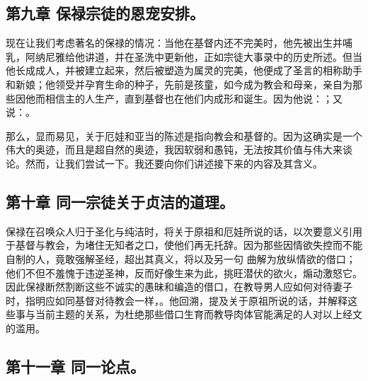 
\subsection{第九章 保禄宗徒的恩宠安排。}

现在让我们考虑著名的保禄的情况：当他在基督内还不完美时，他先被出生并哺乳，阿纳尼雅给他讲道，并在圣洗中更新他，正如宗徒大事录中的历史所述。但当他长成成人，并被建立起来，然后被塑造为属灵的完美，他便成了圣言的相称助手和新娘；他领受并孕育生命的种子，先前是孩童，如今成为教会和母亲，亲自为那些因他而相信主的人生产，直到基督也在他们内成形和诞生。因为他说：；又说：。\par

那么，显而易见，关于厄娃和亚当的陈述是指向教会和基督的。因为这确实是一个伟大的奥迹，而且是超自然的奥迹，我因软弱和愚钝，无法按其价值与伟大来谈论。然而，让我们尝试一下。我还要向你们讲述接下来的内容及其含义。\par


\subsection{第十章 同一宗徒关于贞洁的道理。}

保禄在召唤众人归于圣化与纯洁时，将关于原祖和厄娃所说的话，以次要意义引用于基督与教会，为堵住无知者之口，使他们再无托辞。因为那些因情欲失控而不能自制的人，竟敢强解圣经，超出其真义，将以及另一句 曲解为放纵情欲的借口；他们不但不羞愧于违逆圣神，反而好像生来为此，挑旺潜伏的欲火，煽动激怒它。因此保禄断然割断这些不诚实的愚昧和编造的借口，在教导男人应如何对待妻子时，指明应如同基督对待教会一样，。他回溯，提及关于原祖所说的话，并解释这些事与当前主题的关系，为杜绝那些借口生育而教导肉体官能满足的人对以上经文的滥用。\par


\subsection{第十一章 同一论点。}

